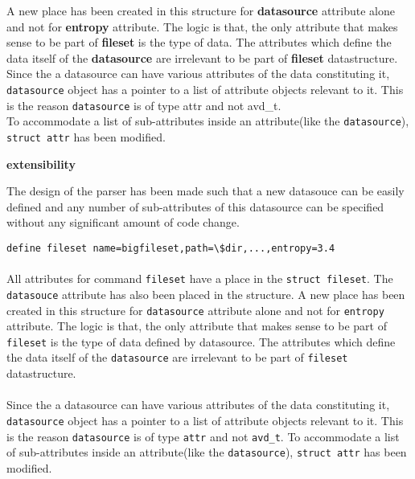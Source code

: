 \noindent A new place has been created in this structure for \textbf{datasource} attribute alone and not for \textbf{entropy} attribute. The logic is that, the only attribute that makes sense to be part of \textbf{fileset} is the type of data. The attributes which define the data itself of the \textbf{datasource} are irrelevant to be part of \textbf{fileset} datastructure.\\
\noindent Since the a datasource can have various attributes of the data constituting it, \verb+datasource+ object has a pointer to a list of attribute objects relevant to it. This is the reason \verb+datasource+ is of type attr and not avd\_t. \\
\noindent To accommodate  a list of sub-attributes inside an attribute(like the \verb+datasource+), \verb+struct attr+ has been modified.




\textbf{extensibility}

The design of the parser has been made such that a new datasouce can be easily defined and any number of sub-attributes of this datasource can be specified without any significant amount of code change.

\verb+define fileset name=bigfileset,path=\$dir,...,entropy=3.4+\\
\paragraph{}
All attributes for command \verb+fileset+ have a place in the \verb+struct fileset+. The \verb+datasouce+ attribute has also been placed in the structure. A new place has been created in this structure for \verb+datasource+ attribute alone and not for \verb+entropy+ attribute. The logic is that, the only attribute that makes sense to be part of \verb+fileset+ is the type of data defined by datasource. The attributes which define the data itself of the \verb+datasource+ are irrelevant to be part of \verb+fileset+ datastructure.
\paragraph{}
Since the a datasource can have various attributes of the data constituting it, \verb+datasource+ object has a pointer to a list of attribute objects relevant to it. This is the reason \verb+datasource+ is of type \verb+attr+ and not \verb+avd_t+. To accommodate  a list of sub-attributes inside an attribute(like the \verb+datasource+), \verb+struct attr+ has been modified.
